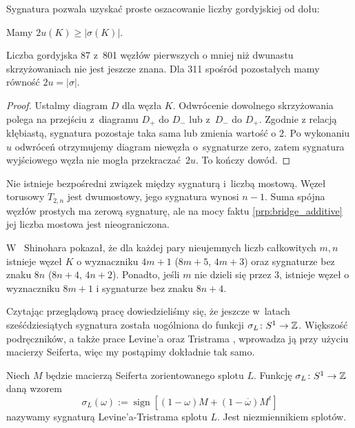 Sygnatura pozwala uzyskać proste oszacowanie liczby gordyjskiej od dołu:

\begin{proposition}
    Mamy $2 u(K) \ge |\sigma(K)|$.
\end{proposition}

Liczba gordyjska 87 z~801 węzłów pierwszych o mniej niż dwunastu skrzyżowaniach nie jest jeszcze znana.
Dla 311 spośród pozostałych mamy równość $2u = |\sigma|$.

\begin{proof}
    Ustalmy diagram $D$ dla węzła $K$.
    Odwrócenie dowolnego skrzyżowania polega na przejściu z~diagramu $D_+$ do $D_-$ lub z~$D_-$ do $D_+$.
    Zgodnie z relacją kłębiastą, sygnatura pozostaje taka sama lub zmienia wartość o $2$.
    Po wykonaniu $u$ odwróceń otrzymujemy diagram niewęzła o~sygnaturze zero, zatem sygnatura wyjściowego węzła nie mogła przekraczać $2u$.
    To kończy dowód.
\end{proof}

Nie istnieje bezpośredni związek między sygnaturą i~liczbą mostową.
Węzeł torusowy $T_{2,n}$ jest dwumostowy, jego sygnatura wynosi $n - 1$.
Suma spójna węzłów prostych ma zerową sygnaturę, ale na mocy faktu \ref{prp:bridge_additive} jej liczba mostowa jest nieograniczona.

W~\cite{shinohara71} Shinohara pokazał, że dla każdej pary nieujemnych liczb całkowitych $m, n$ istnieje węzeł $K$ o wyznaczniku $4m+1$ ($8m+5$, $4m+3$) oraz sygnaturze bez znaku $8n$ ($8n+4$, $4n+2$).
Ponadto, jeśli $m$ nie dzieli się przez $3$, istnieje węzeł o wyznaczniku $8m+1$ i sygnaturze bez znaku $8n+4$.

Czytając przeglądową pracę \cite{conway19} dowiedzieliśmy się, że jeszcze w~latach sześćdziesiątych sygnatura została uogólniona do funkcji $\sigma_L \colon S^1 \to \mathbb Z$.
Większość podręczników, a także prace Levine'a \cite{levine69} oraz Tristrama \cite{tristram69}, wprowadza ją przy użyciu macierzy Seiferta, więc my postąpimy dokładnie tak samo.

\begin{definition}
    Niech $M$ będzie macierzą Seiferta zorientowanego splotu $L$.
    Funkcję $\sigma_L \colon S^1 \to \mathbb Z$ daną wzorem
    \begin{equation}
        \sigma_L(\omega) := \operatorname{sign} [(1-\omega) M + (1 - \overline{\omega})M^t]
    \end{equation}
    nazywamy sygnaturą Levine'a-Tristrama splotu $L$.
    Jest niezmiennikiem splotów.
\end{definition}

